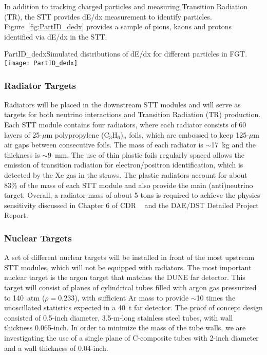 In addition to tracking charged particles and measuring Transition Radiation (TR), 
the STT provides dE/dx measurement to identify particles. 
Figure~\ref{fig:PartID_dedx} provides a sample of pions, kaons and protons identified via dE/dx in the STT.
\begin{cdrfigure}
{PartID_dedx}{Simulated distributions of dE/dx for different particles in FGT.}
\texttt{[image: PartID\_dedx]}
\end{cdrfigure}

\subsubsection{Radiator Targets} 


Radiators will be placed in the downstream STT modules and will serve
as targets for both neutrino interactions and Transition Radiation
(TR) production. Each STT module contains four radiators, where each
radiator consists of 60 layers of 25-$\mu$m polypropylene
(C$_3$H$_6$)$_n$ foils, which are embossed to keep 125-$\mu$m air gaps
between consecutive foils.  The mass of each radiator is $\sim$17~kg
and the thickness is $\sim$9~mm. The use of thin plastic foils
regularly spaced allows the emission of transition radiation for
electron/positron identification, which is detected by the Xe gas in
the straws. The plastic radiators account for about 83\% of the mass of each STT module and 
also provide the main (anti)neutrino target. Overall, a radiator mass of about 5 tons 
is required to achieve the physics sensitivity discussed in 
Chapter 6 of CDR \volphys\ %
and the DAE/DST Detailed Project Report\cite{DPR}. 

\subsubsection{Nuclear Targets} 

A set of different nuclear targets will be installed in front of the
most upstream STT modules, which will not be equipped with radiators.
The most important nuclear target is the argon target that matches
the DUNE far detector.  
This target will consist of planes of cylindrical tubes filled with 
argon gas pressurized to 140~atm ($\rho = 0.233$), with
sufficient Ar mass to provide $\sim$10 times the unoscillated
statistics expected in a 40~t far detector. The proof of concept design 
consisted of 0.5-inch diameter, 3.5-m-long stainless steel tubes, 
with wall thickness 0.065-inch. In order to minimize the mass of the 
tube walls, we are investigating the use of a single plane of C-composite 
tubes with 2-inch diameter and a wall thickness of 0.04-inch.  

